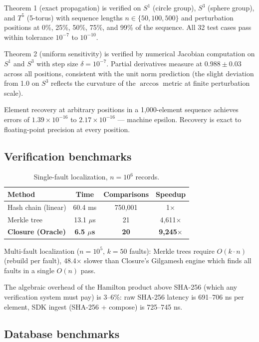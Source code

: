 \documentclass[12pt,a4paper]{article}
\begin{document}
Theorem 1 (exact propagation) is verified on $S^1$ (circle group), $S^3$ (sphere group), and $T^5$ (5-torus) with sequence lengths $n \in \{50, 100, 500\}$ and perturbation positions at 0\%, 25\%, 50\%, 75\%, and 99\% of the sequence. All 32 test cases pass within tolerance $10^{-7}$ to $10^{-10}$.

Theorem 2 (uniform sensitivity) is verified by numerical Jacobian computation on $S^1$ and $S^3$ with step size $\delta = 10^{-7}$. Partial derivatives measure at $0.988 \pm 0.03$ across all positions, consistent with the unit norm prediction (the slight deviation from 1.0 on $S^3$ reflects the curvature of the $\arccos$ metric at finite perturbation scale).

Element recovery at arbitrary positions in a 1,000-element sequence achieves errors of $1.39 \times 10^{-16}$ to $2.17 \times 10^{-16}$ --- machine epsilon. Recovery is exact to floating-point precision at every position.

\subsection{Verification benchmarks}

\begin{table}[h]
\centering
\small
\begin{tabular}{@{}lccc@{}}
\toprule
Method & Time & Comparisons & Speedup \\
\midrule
Hash chain (linear) & 60.4 ms & 750,001 & 1$\times$ \\
Merkle tree & 13.1 $\mu$s & 21 & 4,611$\times$ \\
\textbf{Closure (Oracle)} & \textbf{6.5 $\mu$s} & \textbf{20} & \textbf{9,245$\times$} \\
\bottomrule
\end{tabular}
\caption{Single-fault localization, $n = 10^6$ records.}
\end{table}

Multi-fault localization ($n = 10^5$, $k = 50$ faults): Merkle trees require $O(k \cdot n)$ (rebuild per fault), 48.4$\times$ slower than Closure's Gilgamesh engine which finds all faults in a single $O(n)$ pass.

The algebraic overhead of the Hamilton product above SHA-256 (which any verification system must pay) is 3--6\%: raw SHA-256 latency is 691--706 ns per element, SDK ingest (SHA-256 + compose) is 725--745 ns.

\subsection{Database benchmarks}
\end{document}
